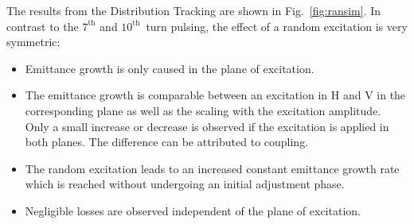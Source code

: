 \documentclass[%
 reprint,
 amsmath,amssymb,
 aps,
prstab,
]{revtex4-1}
\begin{document}
The results from the Distribution Tracking are shown in Fig.~\ref{fig:ransim}. In contrast to the $7^{\mathrm{th}}$ and $10^{\mathrm{th}}$~turn pulsing, the effect of a random excitation is very symmetric:
\begin{itemize}
	\item Emittance growth is only caused in the plane of excitation.
	\item The emittance growth is comparable between an excitation in H and V in the corresponding plane as well as the scaling with the excitation amplitude. Only a small increase or decrease is observed if the excitation is applied in both planes. The difference can be attributed to coupling.
	\item The random excitation leads to an increased constant emittance growth rate which is reached without undergoing an initial adjustment phase.
	\item Negligible losses are observed independent of the plane of excitation.
\end{itemize}
\end{document}
